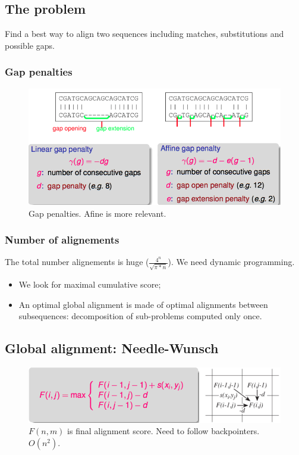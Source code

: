 
\subsection{The problem}

Find a best way to align two sequences including matches, substitutions and possible gaps.

\subsubsection{Gap penalties}

\begin{figure}[H]
	\centering
	\includegraphics[scale=0.4]{images/09_gap.png}
 	\caption{Gap penalties. Afine is more relevant.}
\end{figure}

\subsubsection{Number of alignements}

The total number alignements is huge ($\frac{4^n}{\sqrt{\pi*n}}$). We need dynamic programming.

\begin{itemize}
	\item We look for maximal cumulative score;
	\item An optimal global alignment is made of optimal alignments between subsequences: decomposition of sub-problems computed only once.
\end{itemize}

\subsection{Global alignment: Needle-Wunsch}


\begin{figure}[htp]
	\centering
	\includegraphics[scale=0.4]{images/10_global.png}
 	\caption{$F(n,m)$ is final alignment score. Need to follow backpointers. $O(n^2)$. }
\end{figure}


